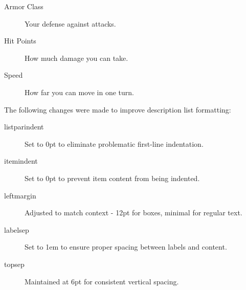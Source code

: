 \documentclass[fonts=wotc, bg=none, nooutline, letterpaper,twocolumn]{dndbook}
\begin{document}
\begin{description}
  \item[Armor Class] Your defense against attacks.
  \item[Hit Points] How much damage you can take.
  \item[Speed] How far you can move in one turn.
\end{description}

The following changes were made to improve description list formatting:

\begin{description}
  \item[listparindent] Set to 0pt to eliminate problematic first-line indentation.
  \item[itemindent] Set to 0pt to prevent item content from being indented.
  \item[leftmargin] Adjusted to match context - 12pt for boxes, minimal for regular text.
  \item[labelsep] Set to 1em to ensure proper spacing between labels and content.
  \item[topsep] Maintained at 6pt for consistent vertical spacing.
\end{description}
\end{document}
